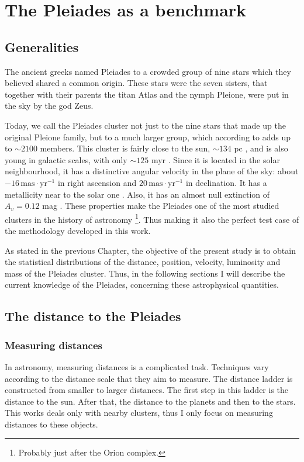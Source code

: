 \chapter{The Pleiades as a benchmark}
\label{chap:pleiades}

\section{Generalities}
\label{sect:generalities}
The ancient greeks named Pleiades to a crowded group of nine stars which they believed shared a common origin. These stars were the seven sisters, that together with their parents the titan Atlas and the nymph Pleione, were put in the sky  by the god Zeus.
 
Today, we call the Pleiades cluster not just to the nine stars that made up the original Pleione family, but to a much larger group, which according to \citet{Bouy2015} adds up to $\sim2100$ members. This cluster is fairly close to the sun, $\sim 134$ pc \cite[with parallaxes of $7.44\pm0.08$ and $7.48\pm0.03$ according to][respectively]{Galli2017,2017A&A...601A..19G}, and is also young in galactic scales, with only $\sim125$ \gls{myr} \citep{Stauffer1998}. Since it is located in the solar neighbourhood, it has a distinctive angular velocity in the plane of the sky: about $-16\,\mathrm{mas\cdot yr^{-1}}$ in right ascension and $20\,\mathrm{mas\cdot yr^{-1}}$ in declination. It has a metallicity near to the solar one \cite[{[Fe/H]$\sim$0},][]{Takeda2017}. Also, it has an almost null extinction of $A_v=0.12$ mag \citep{Guthrie1987}. These properties make the Pleiades one of the most studied clusters in the history of astronomy \footnote{Probably just after the Orion complex.}. Thus making it also the perfect test case of the methodology developed in this work.

As stated in the previous Chapter,  the objective of the present study is to obtain the statistical distributions of the distance, position, velocity, luminosity and mass of the Pleiades cluster. Thus, in the following sections I will describe the current knowledge of the Pleiades, concerning these astrophysical quantities. 
 
\section{The distance to the Pleiades}

\subsection{Measuring distances}
In astronomy, measuring distances is a complicated task. Techniques vary according to the distance scale that they aim to measure. The distance ladder is constructed from smaller to larger distances. The first step in this ladder is the distance to the sun. After that, the distance to the planets and then to the stars. This works deals only with nearby clusters, thus I only focus on measuring distances to these objects. 

